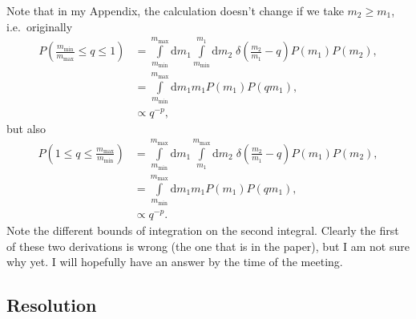 \documentclass[11pt,
        usenames, %
        dvipsnames %
    ]{article}
\newcommand*{\p}[1]{\left(#1\right)}
\begin{document}
Note that in my Appendix, the calculation doesn't change if we take $m_2 \geq
m_1$, i.e.\ originally
\begin{align}
    P\p{\frac{m_{\min}}{m_{\max}} \leq q \leq 1} &=
        \int\limits_{m_{\min}}^{m_{\max}}\mathrm{d}m_1
        \int\limits_{m_{\min}}^{m_1}\mathrm{d}m_2\;
                \delta\p{\frac{m_2}{m_1} - q}P(m_1) P(m_2),\\
        &= \int\limits_{m_{\min}}^{m_{\max}}\mathrm{d}m_1 m_1 P(m_1) P(qm_1),\\
        &\propto q^{-p},
\end{align}
but also
\begin{align}
    P\p{1 \leq q \leq \frac{m_{\max}}{m_{\min}}} &=
        \int\limits_{m_{\min}}^{m_{\max}}\mathrm{d}m_1
        \int\limits_{m_1}^{m_{\max}}\mathrm{d}m_2\;
                \delta\p{\frac{m_2}{m_1} - q}P(m_1) P(m_2),\\
        &= \int\limits_{m_{\min}}^{m_{\max}}\mathrm{d}m_1 m_1 P(m_1) P(qm_1),\\
        &\propto q^{-p}.
\end{align}
Note the different bounds of integration on the second integral. Clearly the
first of these two derivations is wrong (the one that is in the paper), but I am
not sure why yet. I will hopefully have an answer by the time of the meeting.

\subsection{Resolution}
\end{document}

